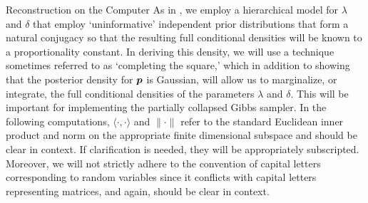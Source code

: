 \begin{chapter}{Reconstruction on the Computer}
As in \citep{bardsley2012mcmc}, we employ a hierarchical model for $\lambda$ and $\delta$ that employ `uninformative' independent prior distributions that form a natural conjugacy so that the resulting full conditional densities will be known to a proportionality constant.
In deriving this density, we will use a technique sometimes referred to as `completing the square,' which in addition to showing that the posterior density for $\mbox{\boldmath$p$}$ is Gaussian, will allow us to marginalize, or integrate, the full conditional densities of the parameters $\lambda$ and $\delta$.
This will be important for implementing the partially collapsed Gibbs sampler.
In the following computations, $\langle \cdot, \cdot \rangle$ and $\|\cdot\|$ refer to the standard Euclidean inner product and norm on the appropriate finite dimensional subspace and should be clear in context.
If clarification is needed, they will be appropriately subscripted. 
Moreover, we will not strictly adhere to the convention of capital letters corresponding to random variables since it conflicts with capital letters representing matrices, and again, should be clear in context.


\end{chapter}
